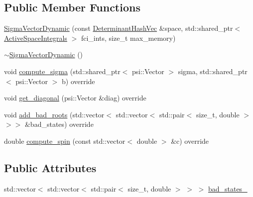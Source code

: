 \subsection*{Public Member Functions}
\begin{DoxyCompactItemize}
\item 
\mbox{\hyperlink{classforte_1_1_sigma_vector_dynamic_ac2fe877e6af7cb012659e616cfc3cbb0}{Sigma\+Vector\+Dynamic}} (const \mbox{\hyperlink{classforte_1_1_determinant_hash_vec}{Determinant\+Hash\+Vec}} \&space, std\+::shared\+\_\+ptr$<$ \mbox{\hyperlink{classforte_1_1_active_space_integrals}{Active\+Space\+Integrals}} $>$ fci\+\_\+ints, size\+\_\+t max\+\_\+memory)
\item 
\mbox{\hyperlink{classforte_1_1_sigma_vector_dynamic_aa6039b8b2283208c770e2a81d8fc41d8}{$\sim$\+Sigma\+Vector\+Dynamic}} ()
\item 
void \mbox{\hyperlink{classforte_1_1_sigma_vector_dynamic_a04a941c88e4c8a1254e96ad8a8dd5c64}{compute\+\_\+sigma}} (std\+::shared\+\_\+ptr$<$ psi\+::\+Vector $>$ sigma, std\+::shared\+\_\+ptr$<$ psi\+::\+Vector $>$ b) override
\item 
void \mbox{\hyperlink{classforte_1_1_sigma_vector_dynamic_a82c707e8e276ae30fef5d78e473eadc1}{get\+\_\+diagonal}} (psi\+::\+Vector \&diag) override
\item 
void \mbox{\hyperlink{classforte_1_1_sigma_vector_dynamic_a06fa37f7134ca1b1efbfc77ccb8afa01}{add\+\_\+bad\+\_\+roots}} (std\+::vector$<$ std\+::vector$<$ std\+::pair$<$ size\+\_\+t, double $>$$>$$>$ \&bad\+\_\+states) override
\item 
double \mbox{\hyperlink{classforte_1_1_sigma_vector_dynamic_ac8aec7cf6d360cfcd391ea90f68c86ba}{compute\+\_\+spin}} (const std\+::vector$<$ double $>$ \&c) override
\end{DoxyCompactItemize}
\subsection*{Public Attributes}
\begin{DoxyCompactItemize}
\item 
std\+::vector$<$ std\+::vector$<$ std\+::pair$<$ size\+\_\+t, double $>$ $>$ $>$ \mbox{\hyperlink{classforte_1_1_sigma_vector_dynamic_a54bdf1da1b5951edd1bd9b9ba4333f0b}{bad\+\_\+states\+\_\+}}
\end{DoxyCompactItemize}
